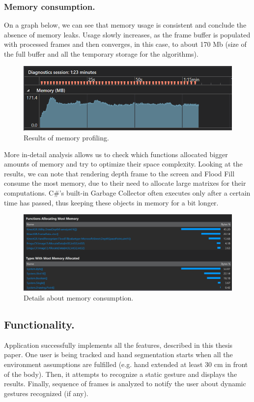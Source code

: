\documentclass[a4paper,11pt,oneside]{article}
\begin{document}
\subsubsection{Memory consumption.}

On a graph below, we can see that memory usage is consistent and conclude the absence of memory leaks. Usage slowly increases, as the frame buffer is populated with processed frames and then converges, in this case, to about 170 Mb (size of the full buffer and all the temporary storage for the algorithms).

\begin{figure}[H]
\centering
\includegraphics[scale=0.8]{memory-profiling.png}
\caption{Results of memory profiling.}
\end{figure}

More in-detail analysis allows us to check which functions allocated bigger amounts of memory and try to optimize their space complexity. Looking at the results, we can note that rendering depth frame to the screen and Flood Fill consume the most memory, due to their need to allocate large matrixes for their computations. C\#'s built-in Garbage Collector often executes only after a certain time has passed, thus keeping these objects in memory for a bit longer.

\begin{figure}[H]
\centering
\includegraphics[scale=0.6]{memory-details.png}
\caption{Details about memory consumption.}
\end{figure}

\subsection{Functionality.}
Application successfully implements all the features, described in this thesis paper. One user is being tracked and hand segmentation starts when all the environment assumptions are fulfilled (e.g. hand extended at least 30 cm in front of the body). Then, it attempts to recognize a static gesture and displays the results. Finally, sequence of frames is analyzed to notify the user about dynamic gestures recognized (if any).
\end{document}
